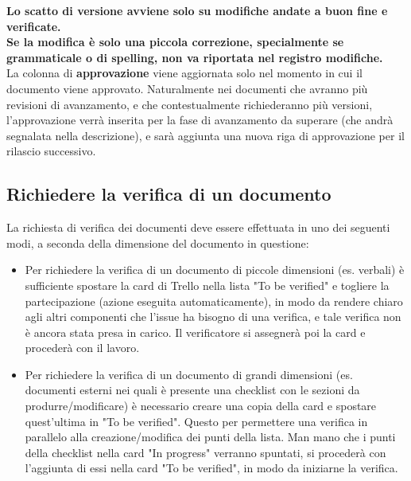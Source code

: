 \noindent
\textbf{Lo scatto di versione avviene solo su modifiche andate a buon fine e verificate.}
\\

\noindent
\textbf{Se la modifica è solo una piccola correzione, specialmente se grammaticale o di
spelling, non va riportata nel registro modifiche.}\\


\noindent
La colonna di \textbf{approvazione} viene aggiornata solo nel momento in cui il documento viene approvato. Naturalmente nei documenti che avranno più revisioni di avanzamento, e che contestualmente richiederanno più versioni, l'approvazione verrà inserita per la fase di avanzamento da superare (che andrà segnalata nella descrizione), e sarà aggiunta una nuova riga di approvazione per il rilascio successivo.

\subsection{Richiedere la verifica di un documento}
La richiesta di verifica dei documenti deve essere effettuata in uno dei seguenti modi, a seconda della dimensione del documento in questione:
\begin{itemize}
    \item Per richiedere la verifica di un documento di piccole dimensioni (es. verbali) è sufficiente spostare 
    la card di Trello nella lista "To be verified" e togliere la partecipazione (azione eseguita automaticamente), 
    in modo da rendere chiaro agli altri componenti che l'issue ha bisogno di una verifica, e tale verifica non è 
    ancora stata presa in carico. Il verificatore si assegnerà poi la card e procederà con il lavoro.
    \item Per richiedere la verifica di un documento di grandi dimensioni (es. documenti esterni nei quali è presente 
    una checklist con le sezioni da produrre/modificare) è necessario creare una copia della card e spostare 
    quest'ultima in "To be verified". Questo per permettere una verifica in parallelo alla creazione/modifica dei punti 
    della lista. Man mano che i punti della checklist nella card "In progress" verranno spuntati, si procederà con 
    l'aggiunta di essi nella card "To be verified", in modo da iniziarne la verifica.
\end{itemize}

